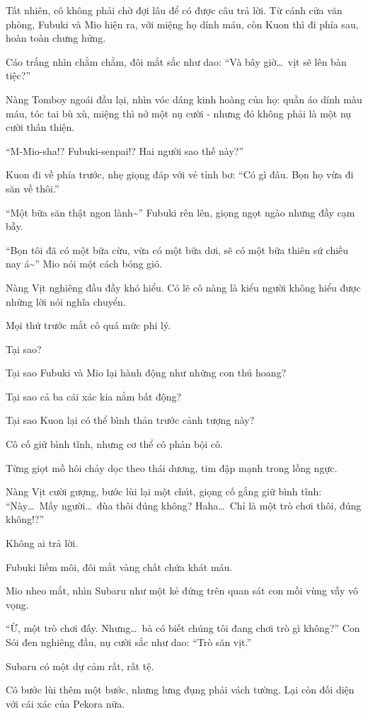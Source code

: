 \documentclass[../main.tex]{subfiles}
\begin{document}
Tất nhiên, cô không phải chờ đợi lâu để có được câu trả lời. Từ cánh cửa văn phòng, Fubuki và Mio hiện ra, với miệng họ dính máu, còn Kuon thì đi phía sau, hoàn toàn chưng hửng.

Cáo trắng nhìn chằm chằm, đôi mắt sắc như dao: ``Và bây giờ\dots\ vịt sẽ lên bàn tiệc?''

Nàng Tomboy ngoái đầu lại, nhìn vóc dáng kinh hoàng của họ: quần áo dính màu máu, tóc tai bù xù, miệng thì nở một nụ cười - nhưng đó không phải là một nụ cười thân thiện.

``M-Mio-sha!? Fubuki-senpai!? Hai người sao thế này?''

Kuon đi về phía trước, nhẹ giọng đáp với vẻ tỉnh bơ: ``Có gì đâu. Bọn họ vừa đi săn về thôi.''

``Một bữa săn thật ngon lành\~{}'' Fubuki rên lên, giọng ngọt ngào nhưng đầy cạm bẫy.

``Bọn tôi đã có một bữa cừu, vừa có một bữa dơi, sẽ có một bữa thiên sứ chiều nay á\~{}'' Mio nói một cách bóng gió.

Nàng Vịt nghiêng đầu đầy khó hiểu. Có lẽ cô nàng là kiểu người không hiểu được những lời nói nghĩa chuyển.

Mọi thứ trước mắt cô quá mức phi lý.

Tại sao?

Tại sao Fubuki và Mio lại hành động như những con thú hoang?

Tại sao cả ba cái xác kia nằm bất động?

Tại sao Kuon lại có thể bình thản trước cảnh tượng này?

Cô cố giữ bình tĩnh, nhưng cơ thể cô phản bội cô.

Từng giọt mồ hôi chảy dọc theo thái dương, tim đập mạnh trong lồng ngực.

Nàng Vịt cười gượng, bước lùi lại một chút, giọng cố gắng giữ bình tĩnh: ``Này\dots\ Mấy người\dots\ đùa thôi đúng không? Haha\dots\ Chỉ là một trò chơi thôi, đúng không!?''

Không ai trả lời.

Fubuki liếm môi, đôi mắt vàng chất chứa khát máu.

Mio nheo mắt, nhìn Subaru như một kẻ đứng trên quan sát con mồi vùng vẫy vô vọng.

``Ừ, một trò chơi đấy. Nhưng\dots\ bà có biết chúng tôi đang chơi trò gì không?'' Con Sói đen nghiêng đầu, nụ cười sắc như dao: ``Trò săn vịt.''

Subaru có một dự cảm rất, rất tệ.

Cô bước lùi thêm một bước, nhưng lưng đụng phải vách tường. Lại còn đối diện với cái xác của Pekora nữa.
\end{document}
